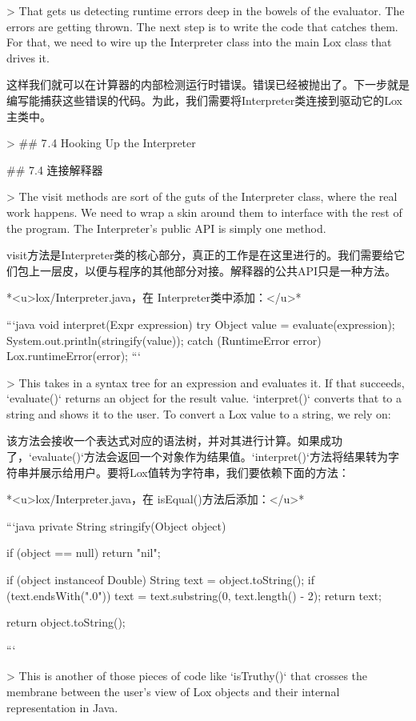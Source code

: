 \documentclass[cn,11pt,chinese]{elegantbook}
\begin{document}
{{{> That gets us detecting runtime errors deep in the bowels of the evaluator. The errors are getting thrown. The next step is to write the code that catches them. For that, we need to wire up the Interpreter class into the main Lox class that drives it.

这样我们就可以在计算器的内部检测运行时错误。错误已经被抛出了。下一步就是编写能捕获这些错误的代码。为此，我们需要将Interpreter类连接到驱动它的Lox主类中。

> ## 7 . 4 Hooking Up the Interpreter

## 7.4 连接解释器

> The visit methods are sort of the guts of the Interpreter class, where the real work happens. We need to wrap a skin around them to interface with the rest of the program. The Interpreter’s public API is simply one method.

visit方法是Interpreter类的核心部分，真正的工作是在这里进行的。我们需要给它们包上一层皮，以便与程序的其他部分对接。解释器的公共API只是一种方法。

*<u>lox/Interpreter.java，在 Interpreter类中添加：</u>*

```java
  void interpret(Expr expression) { 
    try {
      Object value = evaluate(expression);
      System.out.println(stringify(value));
    } catch (RuntimeError error) {
      Lox.runtimeError(error);
    }
  }
```

> This takes in a syntax tree for an expression and evaluates it. If that succeeds, `evaluate()` returns an object for the result value. `interpret()` converts that to a string and shows it to the user. To convert a Lox value to a string, we rely on:

该方法会接收一个表达式对应的语法树，并对其进行计算。如果成功了，`evaluate()`方法会返回一个对象作为结果值。`interpret()`方法将结果转为字符串并展示给用户。要将Lox值转为字符串，我们要依赖下面的方法：

*<u>lox/Interpreter.java，在 isEqual()方法后添加：</u>*

```java
  private String stringify(Object object) {
    if (object == null) return "nil";

    if (object instanceof Double) {
      String text = object.toString();
      if (text.endsWith(".0")) {
        text = text.substring(0, text.length() - 2);
      }
      return text;
    }

    return object.toString();
  }
```

> This is another of those pieces of code like `isTruthy()` that crosses the membrane between the user’s view of Lox objects and their internal representation in Java.

}}}
\end{document}
